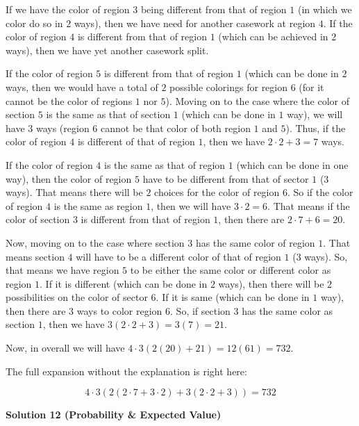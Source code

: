 \begin{enumerate}
 If we have the color of region $3$ being different from that of region $1$ (in which we color do so in $2$ ways), then we have need for another casework at region $4$. If the color of region $4$ is different from that of region $1$ (which can be achieved in $2$ ways), then we have yet another casework split.

 If the color of region $5$ is different from that of region $1$ (which can be done in $2$ ways, then we would have a total of $2$ possible colorings for region $6$ (for it cannot be the color of regions $1$ nor $5$). Moving on to the case where the color of section $5$ is the same as that of section $1$ (which can be done in $1$ way), we will have $3$ ways (region $6$ cannot be that color of both region $1$ and $5$). Thus, if the color of region $4$ is different of that of region $1$, then we have $2\cdot 2 + 3 = 7$ ways.

 If the color of region $4$ is the same as that of region $1$ (which can be done in one way), then the color of region $5$ have to be different from that of sector $1$ ($3$ ways). That means there will be $2$ choices for the color of region $6$. So if the color of region $4$ is the same as region $1$, then we will have $3\cdot 2 = 6$. That means if the color of section $3$ is different from that of region $1$, then there are $2\cdot 7 + 6 = 20$.

 Now, moving on to the case where section $3$ has the same color of region $1$. That means section $4$ will have to be a different color of that of region $1$ ($3$ ways). So, that means we have region $5$ to be either the same color or different color as region $1$. If it is different (which can be done in $2$ ways), then there will be $2$ possibilities on the color of sector $6$. If it is same (which can be done in $1$ way), then there are $3$ ways to color region $6$. So, if section $3$ has the same color as section $1$, then we have $3(2\cdot 2 + 3) = 3(7) = 21$.

 Now, in overall we will have $4\cdot 3 (2(20)+21) = 12(61) = \boxed{732}$.

 The full expansion without the explanation is right here:

 
 \[4\cdot 3(2(2\cdot 7 + 3\cdot 2) + 3(2\cdot 2 + 3)) = 732\]




\textbf{Solution 12 (Probability & Expected Value)}


\end{enumerate}

